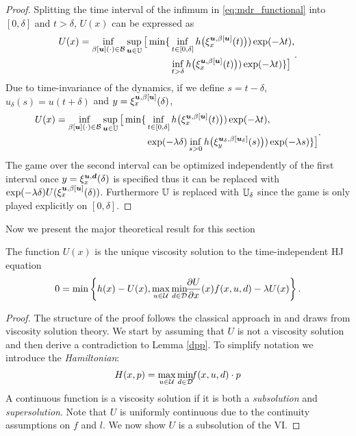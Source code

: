 \begin{for_journal}
\begin{proof}
Splitting the time interval of the infimum in \eqref{eq:mdr_functional} into $[0,\delta]$ and $t>\delta$, $U(x)$ can be expressed as
%
\begin{equation}
\begin{split}{}{}{}
U(x) =
\inf_{\beta[\bm{u}](\cdot) \in \mathcal{B}} \sup_{\bm{u} \in \mathbb{U}} 
\big [\min\{&\inf_{t \in [0, \delta]} h\big(\xi_{x}^{\bm{u},\beta[\bm{u}]}(t)\big))\exp(-\lambda  t),\\ &\inf_{t > \delta} h\big(\xi_{x}^{\bm{u},\beta[\bm{u}]}(t)\big))\exp(-\lambda  t)\}
\big ]
\end{split}.
\end{equation}
%
Due to time-invariance of the dynamics, if we define $s=t-\delta$, $u_\delta(s)=u(t+\delta)$ and $y=\xi_{x}^{\bm{u},\beta[\bm{u}]}(\delta)$,
%
\begin{equation}
\begin{split}
U(x) = 
\inf_{\beta[\bm{u}](\cdot) \in \mathcal{B}} \sup_{\bm{u} \in \mathbb{U}} 
\big [\min\{&\inf_{t \in [0, \delta]} h\big(\xi_{x}^{\bm{u},\beta[\bm{u}]}(t)\big))\exp(-\lambda  t), \\ &\exp(-\lambda \delta) \inf_{s > 0} h\big(\xi_{y}^{\bm{u}_\delta,\beta[\bm{u}_\delta]}(s)\big))\exp(-\lambda s)\}
\big ]
\end{split}.
\end{equation}
%
The game over the second interval can be optimized independently of the first interval once $y=\xi_{x}^{\bm{u},\bm{d}}(\delta)$ is specified thus it can be replaced with $\exp(-\lambda \delta)U(\xi_{x}^{\bm{u},\beta[\bm{u}]}(\delta))$. Furthermore $\mathbb{U}$ is replaced with $\mathbb{U}_\delta$ since the game is only played explicitly on $[0,\delta]$.
\end{proof}

Now we present the major theoretical result for this section

\begin{theorem}
The function $U(x)$ is the unique viscosity solution to the time-independent HJ equation
%
\begin{equation}\label{eq:HJ_mdr}
    0 = \min\left\{h(x)-U(x), \max_{u\in\mathcal{U}} \min_{ d\in\mathcal{D}} \!\!\frac{\partial U}{\partial x}(x) f(x,u, d) - \lambda U(x)\right\}.
\end{equation}
%
\end{theorem}

\begin{proof}
The structure of the proof follows the classical approach in \cite{Evans1984} and draws from viscosity solution theory. We start by assuming that $U$ is not a viscosity solution and then derive a contradiction to Lemma \ref{dpp}. To simplify notation we introduce the \emph{Hamiltonian}:
\begin{equation}\label{eq:hamiltonian}
H(x,p) = \max_{u\in\mathcal{U}} \min_{ d\in\mathcal{D}} \!\! f(x,u,d)\cdot p
\end{equation}
A continuous function is a viscosity solution if it is both a \emph{subsolution} and \emph{supersolution}. Note that $U$ is uniformly continuous due to the continuity assumptions on $f$ and $l$. We now show $U$ is a subsolution of the VI.


\end{proof}
\end{for_journal}
